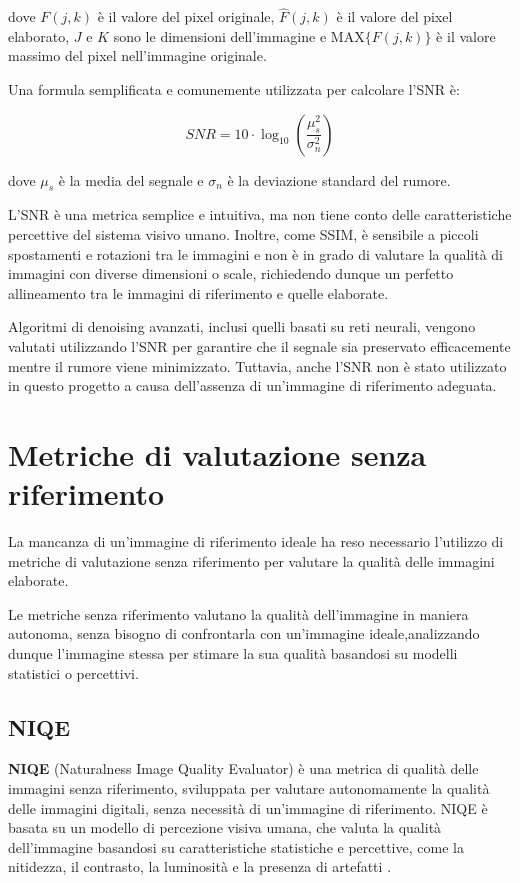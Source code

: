 dove $F(j, k)$ è il valore del pixel originale, $\hat F(j, k)$ è il valore del pixel elaborato, $J$ e $K$ sono le dimensioni dell'immagine e $\text{MAX}\{F(j, k)\}$ è il valore massimo del pixel nell'immagine originale.

Una formula semplificata e comunemente utilizzata per calcolare l'SNR è:

$$
SNR = 10\cdot \log_{10} \left(\dfrac{\mu_s^2}{\sigma_n^2}\right)
$$

dove $\mu_s$ è la media del segnale e $\sigma_n$ è la deviazione standard del rumore.

L'SNR è una metrica semplice e intuitiva, ma non tiene conto delle caratteristiche percettive del sistema visivo umano. Inoltre, come SSIM, è sensibile a piccoli spostamenti e rotazioni tra le immagini e non è in grado di valutare la qualità di immagini con diverse dimensioni o scale, richiedendo dunque un perfetto allineamento tra le immagini di riferimento e quelle elaborate.

Algoritmi di denoising avanzati, inclusi quelli basati su reti neurali, vengono valutati utilizzando l'SNR per garantire che il segnale sia preservato efficacemente mentre il rumore viene minimizzato. Tuttavia, anche l'SNR non è stato utilizzato in questo progetto a causa dell'assenza di un'immagine di riferimento adeguata.

\section{Metriche di valutazione senza riferimento} \label{sec:nr_metrics}

La mancanza di un'immagine di riferimento ideale ha reso necessario l'utilizzo di metriche di valutazione senza riferimento per valutare la qualità delle immagini elaborate.

Le metriche senza riferimento valutano la qualità dell'immagine in maniera autonoma, senza bisogno di confrontarla con un'immagine ideale,analizzando dunque l'immagine stessa per stimare la sua qualità basandosi su modelli statistici o percettivi.

\subsection{NIQE} \label{subsec:niqe}

\textbf{NIQE} (Naturalness Image Quality Evaluator) è una metrica di qualità delle immagini senza riferimento, sviluppata per valutare autonomamente la qualità delle immagini digitali, senza necessità di un'immagine di riferimento. NIQE è basata su un modello di percezione visiva umana, che valuta la qualità dell'immagine basandosi su caratteristiche statistiche e percettive, come la nitidezza, il contrasto, la luminosità e la presenza di artefatti \cite{niqe}.

